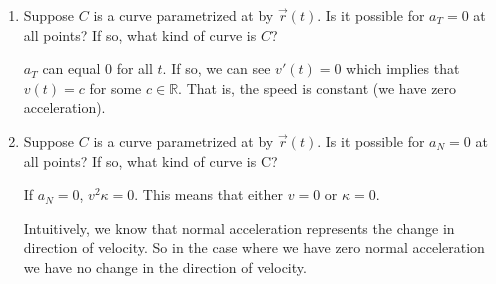 \documentclass{article}
\begin{document}
\begin{enumerate}
\begin{enumerate}[label= (\alph*)]
        \item Suppose $C$ is a curve parametrized at by $\vec r (t)$. Is it possible for $a_T = 0$
        at all points? If so, what kind of curve is $C$?

        $a_T$ can equal $0$ for all $t$. If so, we can see $v'(t)=0$ which implies that $v(t)=c$ for some
        $c\in\mathbb{R}$. That is, the speed is constant (we have zero acceleration).

        \item Suppose $C$ is a curve parametrized at by $\vec r (t)$. Is it possible for $a_N = 0$
        at all points? If so, what kind of curve is C?

        If $a_N=0$, $v^2\kappa=0$. This means that either $v=0$ or $\kappa=0$. 

        Intuitively, we know that normal acceleration represents the change in direction of velocity. So 
        in the case where we have zero normal acceleration we have no change in the direction of velocity.
\end{enumerate}
\end{enumerate}
\end{document}

